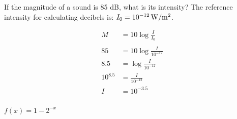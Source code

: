 \documentclass[fleqn,addpoints]{exam}
\begin{document}
\begin{questions}
    \question[5]
      If the magnitude of a sound is 85 dB, what is its intensity?  The reference intensity for calculating decibels is:
      $I_0 = \unit[10^{-12}]{W/m^2}$.
      

      \begin{solution}
        \begin{align*}
          M        & = 10 \log \frac{I}{I_0} \\
          \\
          85       & = 10 \log \frac{I}{10^{-12}} \\
          8.5      & = \log \frac{I}{10^{-12}} \\
          10^{8.5} & = \frac{I}{10^{-12}} \\
          I        & = \boxed{ 10^{-3.5} } \\
        \end{align*}
      \end{solution}

    \ifprintanswers
      \pagebreak
    \fi

    \question $f(x) = 1 - 2^{-x}$
\end{questions}
\end{document}
